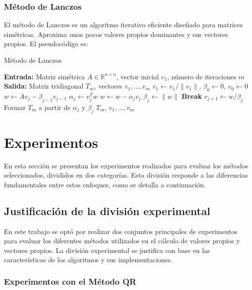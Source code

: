 \documentclass{article}
\begin{document}
\subsubsection{Método de Lanczos}

El método de Lanczos es un algoritmo iterativo eficiente diseñado para matrices simétricas. Aproxima unos pocos valores propios dominantes y sus vectores propios. El pseudocódigo es:

\begin{algorithm}[H]
\caption{Método de Lanczos}
\begin{algorithmic}[1]
\State \textbf{Entrada:} Matriz simétrica $A \in \mathbb{R}^{n \times n}$, vector inicial $v_1$, número de iteraciones $m$
\State \textbf{Salida:} Matriz tridiagonal $T_m$, vectores $v_1, \dots, v_m$
\State $v_1 \gets v_1 / \|v_1\|$, $\beta_0 \gets 0$, $v_0 \gets 0$
    \State $w \gets A v_j - \beta_{j-1} v_{j-1}$ 
    \State $\alpha_j \gets v_j^T w$ 
    \State $w \gets w - \alpha_j v_j$ 
    \State $\beta_j \gets \|w\|$
        \State \textbf{Break} 
    \EndIf
    \State $v_{j+1} \gets w / \beta_j$ 
\EndFor
\State Formar $T_m$ a partir de $\alpha_j$ y $\beta_j$
\State \Return $T_m$, $v_1, \dots, v_m$
\end{algorithmic}
\end{algorithm}


\newpage
\section{Experimentos}
En esta sección se presentan los experimentos realizados para evaluar los métodos seleccionados, divididos en dos categorías. Esta división responde a las diferencias fundamentales entre estos enfoques, como se detalla a continuación.
\subsection{Justificación de la división experimental}

En este trabajo se optó por realizar dos conjuntos principales de experimentos para evaluar los diferentes métodos utilizados en el cálculo de valores propios y vectores propios. La división experimental se justifica con base en las características de los algoritmos y sus implementaciones.

\subsubsection{Experimentos con el Método QR}
\end{document}

